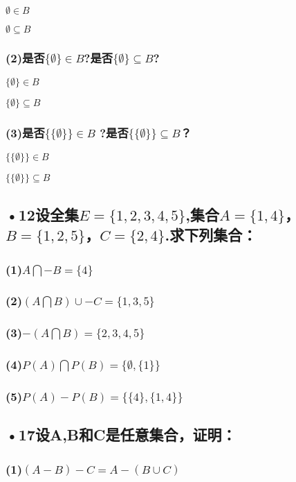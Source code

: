\documentclass[UTF8]{ctexart}
\begin{document}
$\emptyset \in B$

$\emptyset \subseteq B$
\subsubsection*{(2)是否$\{\emptyset\}\in B $?是否$\{\emptyset\}\subseteq B $?}

$\{\emptyset\}\in B $

$\{\emptyset\}\subseteq B $
\subsubsection*{(3)是否$\{\{\emptyset\}\}\in B $ ?是否$\{\{\emptyset\}\}\subseteq B $？}

$\{\{\emptyset\}\}\in B $

$\{\{\emptyset\}\}\subseteq B $
\subsection*{•12设全集$E=\{1,2,3,4,5 \} $,集合$A=\{1,4\} $，$B=\{1,2,5 \} $，$C=\{2,4\}$.求下列集合：}
\subsubsection*{(1)$A\bigcap -B =\{4 \}$}

\subsubsection*{(2)$(A\bigcap B) \cup -C=\{1,3,5 \}$}
\subsubsection*{(3)$-(A\bigcap B) =\{2,3,4,5 \}$}
\subsubsection*{(4)$P(A)\bigcap P(B) =\{\emptyset ,\{1\} \}$}
\subsubsection*{(5)$P(A)-P(B) =\{\{4\},\{1,4\} \}$}

\subsection*{•17设A,B和C是任意集合，证明：}
\subsubsection*{(1)$(A-B)-C=A-(B\cup C) $}
\end{document}
